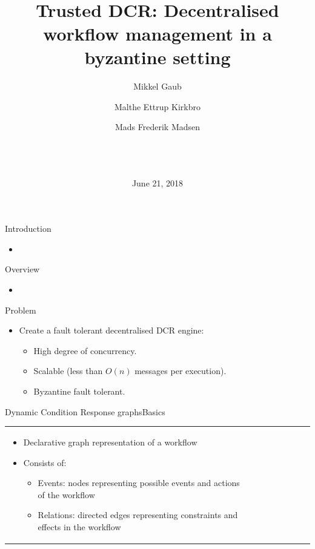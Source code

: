 \documentclass{beamer}
\title{~\\ ~\\ ~\\ Trusted DCR: Decentralised workflow management in a byzantine setting}
\author{Mikkel Gaub \and Malthe Ettrup Kirkbro \and Mads Frederik Madsen}
\date{~\\ ~\\ ~\\ \center June 21, 2018 }
\begin{document}
\maketitle

\begin{frame}{Introduction}%
%
    \begin{itemize}
    	\item
    \end{itemize}
\end{frame}

\begin{frame}{Overview}%
	\begin{itemize}
		\item
	\end{itemize}
\end{frame}

\begin{frame}{Problem}%
\begin{itemize}
	\item Create a fault tolerant decentralised DCR engine:

	\vfill

	\begin{itemize}
		\item High degree of concurrency.

		\vfill

		\item Scalable (less than $O(n)$ messages per execution).

		\vfill

		\item Byzantine fault tolerant.
	\end{itemize}
\end{itemize}
\end{frame}

\begin{frame}{Dynamic Condition Response graphs}{Basics}%
\begin{tabular}{lc}
  \parbox{0.5\linewidth}{\begin{itemize}
		\item Declarative graph representation of a workflow
		\item Consists of:
		\begin{itemize}
			\item Events: nodes representing possible events and actions of the workflow
			\item Relations: directed edges representing constraints and effects in the workflow
		\end{itemize}
	\end{itemize}
	}
	&
  \parbox{0.5\linewidth}{
	\begin{figure}[p]
	\end{figure}
	}
\end{tabular}
\end{frame}
\end{document}

